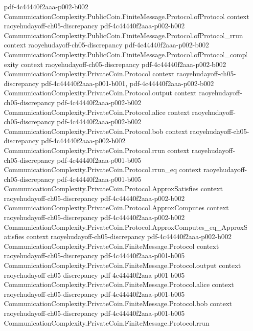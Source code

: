 \begin{theorem}
  {pdf-4c44440f2aaa-p002-b002}
\proofstep
  {CommunicationComplexity.PublicCoin.FiniteMessage.Protocol.ofProtocol}
  {context}
  {raoyehudayoff-ch05-discrepancy}
  {pdf-4c44440f2aaa-p002-b002}
\proofstep
  {CommunicationComplexity.PublicCoin.FiniteMessage.Protocol.ofProtocol_rrun}
  {context}
  {raoyehudayoff-ch05-discrepancy}
  {pdf-4c44440f2aaa-p002-b002}
\proofstep
  {CommunicationComplexity.PublicCoin.FiniteMessage.Protocol.ofProtocol_complexity}
  {context}
  {raoyehudayoff-ch05-discrepancy}
  {pdf-4c44440f2aaa-p002-b002}
\proofstep
  {CommunicationComplexity.PrivateCoin.Protocol}
  {context}
  {raoyehudayoff-ch05-discrepancy}
  {pdf-4c44440f2aaa-p001-b001,
    pdf-4c44440f2aaa-p002-b002}
\proofstep
  {CommunicationComplexity.PrivateCoin.Protocol.output}
  {context}
  {raoyehudayoff-ch05-discrepancy}
  {pdf-4c44440f2aaa-p002-b002}
\proofstep
  {CommunicationComplexity.PrivateCoin.Protocol.alice}
  {context}
  {raoyehudayoff-ch05-discrepancy}
  {pdf-4c44440f2aaa-p002-b002}
\proofstep
  {CommunicationComplexity.PrivateCoin.Protocol.bob}
  {context}
  {raoyehudayoff-ch05-discrepancy}
  {pdf-4c44440f2aaa-p002-b002}
\proofstep
  {CommunicationComplexity.PrivateCoin.Protocol.rrun}
  {context}
  {raoyehudayoff-ch05-discrepancy}
  {pdf-4c44440f2aaa-p001-b005}
\proofstep
  {CommunicationComplexity.PrivateCoin.Protocol.rrun_eq}
  {context}
  {raoyehudayoff-ch05-discrepancy}
  {pdf-4c44440f2aaa-p001-b005}
\proofstep
  {CommunicationComplexity.PrivateCoin.Protocol.ApproxSatisfies}
  {context}
  {raoyehudayoff-ch05-discrepancy}
  {pdf-4c44440f2aaa-p002-b002}
\proofstep
  {CommunicationComplexity.PrivateCoin.Protocol.ApproxComputes}
  {context}
  {raoyehudayoff-ch05-discrepancy}
  {pdf-4c44440f2aaa-p002-b002}
\proofstep
  {CommunicationComplexity.PrivateCoin.Protocol.ApproxComputes_eq_ApproxSatisfies}
  {context}
  {raoyehudayoff-ch05-discrepancy}
  {pdf-4c44440f2aaa-p002-b002}
\proofstep
  {CommunicationComplexity.PrivateCoin.FiniteMessage.Protocol}
  {context}
  {raoyehudayoff-ch05-discrepancy}
  {pdf-4c44440f2aaa-p001-b005}
\proofstep
  {CommunicationComplexity.PrivateCoin.FiniteMessage.Protocol.output}
  {context}
  {raoyehudayoff-ch05-discrepancy}
  {pdf-4c44440f2aaa-p001-b005}
\proofstep
  {CommunicationComplexity.PrivateCoin.FiniteMessage.Protocol.alice}
  {context}
  {raoyehudayoff-ch05-discrepancy}
  {pdf-4c44440f2aaa-p001-b005}
\proofstep
  {CommunicationComplexity.PrivateCoin.FiniteMessage.Protocol.bob}
  {context}
  {raoyehudayoff-ch05-discrepancy}
  {pdf-4c44440f2aaa-p001-b005}
\proofstep
  {CommunicationComplexity.PrivateCoin.FiniteMessage.Protocol.rrun}

\end{theorem}
